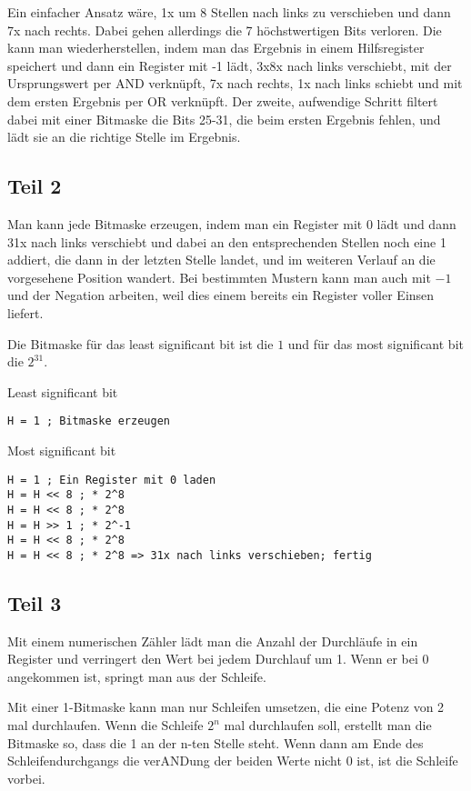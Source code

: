 \documentclass[10pt,a4paper]{article}
\begin{document}
Ein einfacher Ansatz wäre, 1x um 8 Stellen nach links zu verschieben und dann 7x nach rechts.
Dabei gehen allerdings die 7 höchstwertigen Bits verloren.
Die kann man wiederherstellen, indem man das Ergebnis in einem Hilfsregister speichert und dann ein Register mit -1 lädt, 3x8x nach links verschiebt, mit der Ursprungswert per AND verknüpft, 7x nach rechts, 1x nach links schiebt und mit dem ersten Ergebnis per OR verknüpft.
Der zweite, aufwendige Schritt filtert dabei mit einer Bitmaske die Bits 25-31, die beim ersten Ergebnis fehlen, und lädt sie an die richtige Stelle im Ergebnis.

\subsection*{Teil 2}

Man kann jede Bitmaske erzeugen, indem man ein Register mit 0 lädt und dann 31x nach links verschiebt und dabei an den entsprechenden Stellen noch eine 1 addiert, die dann in der letzten Stelle landet, und im weiteren Verlauf an die vorgesehene Position wandert.
Bei bestimmten Mustern kann man auch mit $-1$ und der Negation arbeiten, weil dies einem bereits ein Register voller Einsen liefert.

Die Bitmaske für das least significant bit ist die $1$ und für das most significant bit die $2^{31}$.

Least significant bit
\begin{lstlisting}
H = 1 ; Bitmaske erzeugen
\end{lstlisting}

Most significant bit
\begin{lstlisting}
H = 1 ; Ein Register mit 0 laden
H = H << 8 ; * 2^8
H = H << 8 ; * 2^8
H = H >> 1 ; * 2^-1
H = H << 8 ; * 2^8
H = H << 8 ; * 2^8 => 31x nach links verschieben; fertig
\end{lstlisting}

\subsection*{Teil 3}

Mit einem numerischen Zähler lädt man die Anzahl der Durchläufe in ein Register und verringert den Wert bei jedem Durchlauf um 1.
Wenn er bei 0 angekommen ist, springt man aus der Schleife.

Mit einer 1-Bitmaske kann man nur Schleifen umsetzen, die eine Potenz von 2 mal durchlaufen.
Wenn die Schleife $2^{n}$ mal durchlaufen soll, erstellt man die Bitmaske so, dass die 1 an der n-ten Stelle steht.
Wenn dann am Ende des Schleifendurchgangs die verANDung der beiden Werte nicht $0$ ist, ist die Schleife vorbei.
\end{document}
